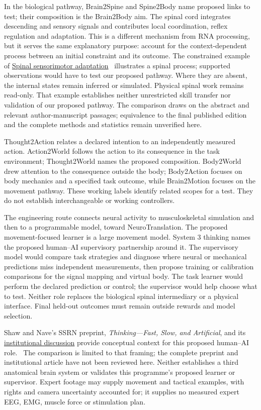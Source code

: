 In the biological pathway, Brain2Spine and Spine2Body name proposed links to
test; their composition is the Brain2Body aim. The spinal cord integrates
descending and sensory signals and contributes local coordination, reflex
regulation and adaptation. This is a different mechanism from RNA processing,
but it serves the same explanatory purpose: account for the context-dependent
process between an initial constraint and its outcome. The constrained example of
\href{https://pubmed.ncbi.nlm.nih.gov/38603479/}{Spinal sensorimotor adaptation}~\cite{lavaud2024}
illustrates a spinal process; supported observations would have to test our proposed pathway. Where they are absent, the internal
states remain inferred or simulated. Physical spinal work remains read-only.
That example establishes neither unrestricted skill transfer nor validation
of our proposed pathway. The comparison draws on the abstract and
relevant author-manuscript passages; equivalence to the final published edition
and the complete methods and statistics remain unverified here.

Thought2Action relates a declared intention to an independently measured action.
Action2World follows the action to its consequence in the task environment;
Thought2World names the proposed composition. Body2World drew attention to the
consequence outside the body; Body2Action focuses on body mechanics and a
specified task outcome, while Brain2Motion focuses on the movement pathway.
These working labels identify related scopes for a test. They do not establish
interchangeable or working controllers.

The engineering route connects neural activity to musculoskeletal simulation
and then to a programmable model, toward NeuroTranslation. The proposed
movement-focused learner is a large movement model. System 3 thinking names
the proposed human--AI supervisory partnership around it. The supervisory
model would compare task strategies and diagnose where neural or mechanical
predictions miss independent measurements, then propose training or calibration
comparisons for the signal mapping and virtual body. The task learner would
perform the declared prediction or control; the supervisor would help choose
what to test. Neither role replaces the biological spinal intermediary or a
physical interface. Final held-out outcomes must remain outside rewards and
model selection.
\par\noindent Shaw and Nave's SSRN preprint,
\emph{Thinking---Fast, Slow, and Artificial}, and its
\href{https://executiveeducation.wharton.upenn.edu/thought-leadership/wharton-at-work/2026/05/thinking-fast-slow-and-artificially/}{institutional discussion}
provide conceptual context for this proposed human--AI role.~\cite{shawNaveSystem3Retained}
The comparison is limited to that framing; the complete preprint and institutional
article have not been reviewed here. Neither establishes a third anatomical brain
system or validates this programme's proposed learner or supervisor. Expert footage may supply
movement and tactical examples, with rights and camera uncertainty accounted
for; it supplies no measured expert EEG, EMG, muscle force or stimulation plan.

